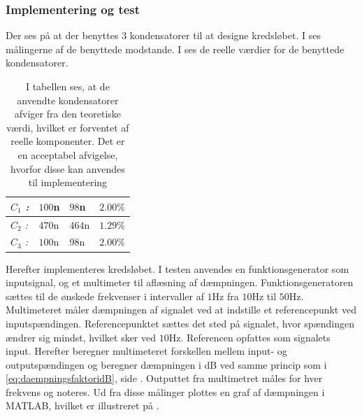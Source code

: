 \subsubsection{Implementering og test} 
Der ses på  at der benyttes 3 kondensatorer til at designe kredsløbet. I  ses målingerne af de benyttede modstande. I  ses de reelle værdier for de benyttede kondensatorer.
\begin{table}[H]
	\centering
	\begin{tabular}{|l|l|l|l|}
		\hline
		\textit{$C_{1}$ :}                            & $100$n             & $98$n              & $2.00\%$           \\ \hline
		\textit{$C_{2}$ :}                            & $470$n             & $464$n             & $1.29\%$           \\ \hline 
		\textit{$C_{3}$ :}                            & $100$n             & $98$n              & $2.00\%$           \\ \hline
	\end{tabular}
	\caption{I tabellen ses, at de anvendte kondensatorer afviger fra den teoretiske værdi, hvilket er forventet af reelle komponenter. Det er en acceptabel afvigelse, hvorfor disse kan anvendes til implementering}
	\label{Tab:Maalingfilter}
\end{table}
\noindent Herefter implementeres kredsløbet. I testen anvendes en funktionsgenerator som inputsignal, og et multimeter til aflæsning af dæmpningen. Funktionsgeneratoren sættes til de ønskede frekvenser i intervaller af $1$Hz fra $10$Hz til $50$Hz. Multimeteret måler dæmpningen af signalet ved at indstille et referencepunkt ved inputspændingen. Referencepunktet sættes det sted på signalet, hvor spændingen ændrer sig mindst, hvilket sker ved $10$Hz. Referencen opfattes som signalets input. Herefter beregner multimeteret forskellen mellem input- og outputspændingen og beregner dæmpningen i dB ved samme princip som i \eqref{eq:daempningsfaktoridB}, side \pageref{eq:daempningsfaktoridB}. Outputtet fra multimetret måles for hver frekvens og noteres. Ud fra disse målinger plottes en graf af dæmpningen i MATLAB, hvilket er illustreret på .  

